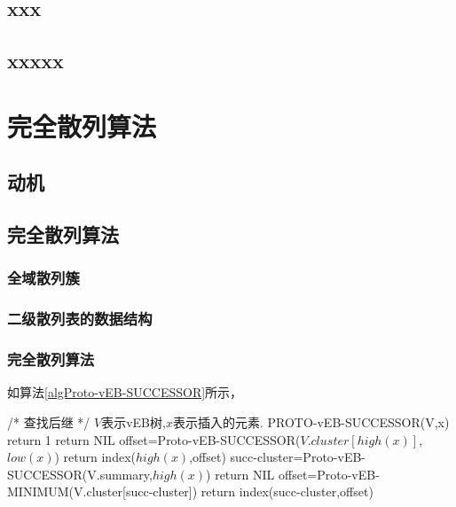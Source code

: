 \documentclass[10pt,journal,compsoc]{IEEEtran}
\begin{document}
\subsection{xxx}
\subsection{xxxxx}

\section{完全散列算法}

\subsection{动机}


\subsection{完全散列算法}
\subsubsection{全域散列簇}


\subsubsection{二级散列表的数据结构}

\subsubsection{完全散列算法}

\indent 如算法\ref{algProto-vEB-SUCCESSOR}所示，

\renewcommand{\algorithmicrequire}{\textbf{Input:}}
\renewcommand{\algorithmicensure}{\textbf{Output:}}
\begin{algorithm}[H]
\scriptsize   
\caption{SUCCESSOR(V,x)}           
\label{algProto-vEB-SUCCESSOR}                        
\begin{algorithmic}%
\STATE /* 查找后继 */
\REQUIRE $V$表示vEB树,$x$表示插入的元素.
\STATE PROTO-vEB-SUCCESSOR(V,x)
   \STATE return 1
   \ELSE
   \STATE return NIL
   \ENDIF
\ELSE
   \STATE offset=Proto-vEB-SUCCESSOR($V.cluster[high(x)]$,$low(x)$)
      \STATE return index($high(x)$,offset)
   \ELSE
       \STATE succ-cluster=Proto-vEB-SUCCESSOR(V.summary,$high(x)$)
         \STATE return NIL
      \ELSE
         \STATE offset=Proto-vEB-MINIMUM(V.cluster[succ-cluster])
         \STATE return index(succ-cluster,offset)
      \ENDIF
   \ENDIF   
\ENDIF
\end{algorithmic}
\end{algorithm}
\end{document}
